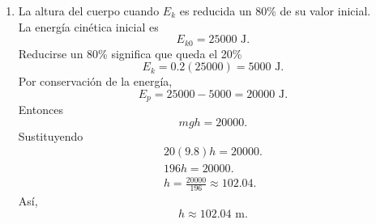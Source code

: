 \documentclass[12pt,a4paper]{article}
\begin{document}
\begin{solucion}
\begin{enumerate}
\begin{gather*}
                E_{k}=5400\text{ J}.
            \end{gather*}
            \item[(d)] La altura del cuerpo cuando $E_{k}$ es reducida un 80\% de su valor inicial.\\
            La energía cinética inicial es
            \begin{equation*}
                E_{k0}=25000\text{ J}.
            \end{equation*}
            Reducirse un 80\% significa que queda el 20\%
            \begin{equation*}
                E_{k}=0.2(25000)=5000\text{ J}.
            \end{equation*}
            Por conservación de la energía,
            \begin{equation*}
                E_{p}=25000-5000=20000\text{ J}.
            \end{equation*}
            Entonces
            \begin{equation*}
                mgh=20000.
            \end{equation*}
            Sustituyendo
            \begin{gather*}
                20(9.8)h=20000.\\
                196h=20000.\\
                h=\frac{20000}{196}\approx102.04.
            \end{gather*}
            Así,
            \begin{equation*}
                h\approx102.04\text{ m}.
            \end{equation*}
        \end{enumerate}
    \end{solucion}
\end{document}
